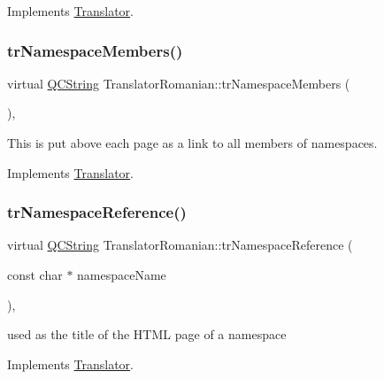 Implements \mbox{\hyperlink{class_translator}{Translator}}.

\mbox{\label{class_translator_romanian_aa46ce7149ac69bf24d196784fcccbdfc}} 
\subsubsection{\texorpdfstring{trNamespaceMembers()}{trNamespaceMembers()}}
{\footnotesize\ttfamily virtual \mbox{\hyperlink{class_q_c_string}{Q\+C\+String}} Translator\+Romanian\+::tr\+Namespace\+Members (\begin{DoxyParamCaption}{ }\end{DoxyParamCaption})\hspace{0.3cm}{\ttfamily [inline]}, {\ttfamily [virtual]}}

This is put above each page as a link to all members of namespaces. 

Implements \mbox{\hyperlink{class_translator}{Translator}}.

\mbox{\label{class_translator_romanian_aac21f6ebc36fcf33f3eb7b2a345cde31}} 
\subsubsection{\texorpdfstring{trNamespaceReference()}{trNamespaceReference()}}
{\footnotesize\ttfamily virtual \mbox{\hyperlink{class_q_c_string}{Q\+C\+String}} Translator\+Romanian\+::tr\+Namespace\+Reference (\begin{DoxyParamCaption}\item[{const char $\ast$}]{namespace\+Name }\end{DoxyParamCaption})\hspace{0.3cm}{\ttfamily [inline]}, {\ttfamily [virtual]}}

used as the title of the H\+T\+ML page of a namespace 

Implements \mbox{\hyperlink{class_translator}{Translator}}.

\mbox{\label{class_translator_romanian_a92e18f3afd30efa2cbac9eb58c411b21}} 
